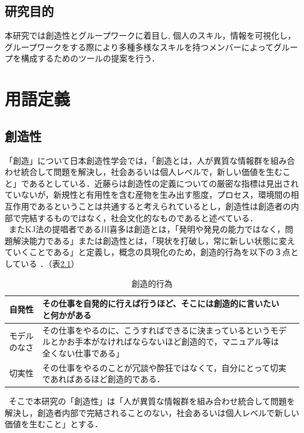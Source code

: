 \documentclass{funthesis}
\begin{document}
\section{研究目的}
本研究では創造性とグループワークに着目し,  個人のスキル，情報を可視化し，グループワークをする際により多種多様なスキルを持つメンバーによってグループを構成するためのツールの提案を行う．
\chapter{用語定義}
\section{創造性}
「創造」について日本創造性学会では，「創造とは，人が異質な情報群を組み合わせ統合して問題を解決し，社会あるいは個人レベルで，新しい価値を生むこと」であるとしている\cite{A12}．近藤ら\cite{A13}は創造性の定義についての厳密な指標は見出されていないが，新規性と有用性を含む産物を生み出す態度，プロセス，環境間の相互作用であるということは共通すると考えられているとし，創造性は創造者の内部で完結するものではなく，社会文化的なものであると述べている．\\
\ またKJ法の提唱者である川喜多は創造とは，「発明や発見の能力ではなく，問題解決能力である」または創造性とは，「現状を打破し，常に新しい状態に変えていくことである」と定義し，概念の具現化のため，創造的行為を以下の３点としている\cite{A14} \cite{A15}．（表\ref{souzousei}）
\begin{table}[h]
\begin{center}
  \begin{tabular}{|c|p{105mm}|p{10mm}|} \hline
    自発性& その仕事を自発的に行えば行うほど、そこには創造的に言いたいと何かがある\tabularnewline \hline
    モデルのなさ& その仕事をやるのに、こうすればできるに決まっているというモデルとかお手本がなければならないほど創造的で，マニュアル等は全くない仕事である」 \tabularnewline \hline
    切実性&その仕事をやるのことが冗談や酔狂ではなくて，自分にとって切実であればあるほど創造的である．\tabularnewline
    \hline
  \end{tabular}
  \caption{創造的行為}
  \label{souzousei}
  \end{center}
\end{table}


\ そこで本研究の「創造性」は「人が異質な情報群を組み合わせ統合して問題を解決し，創造者内部で完結されることのない，社会あるいは個人レベルで新しい価値を生むこと」とする．
\end{document}
